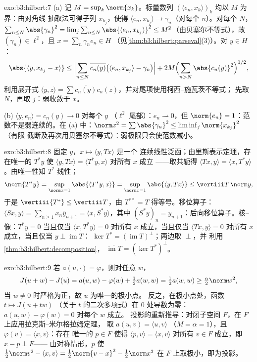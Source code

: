\begin{solution}{exo:b3:hilbert:7}
(a) 记 $M = \sup_k\norm{x_k}$。标量数列
$(\langle e_n, x_k\rangle)_k$ 均以 $M$ 为界：由对角线
抽取法可得子列 $x_{k_j}$，使得 $\langle e_n, x_{k_j}\rangle
\to \gamma_n$（对每个 $n$）。对每个 $N$，$\sum_{n\leq
N}\abs{\gamma_n}^2 = \lim_j\sum_{n\leq N}\abs{\langle e_n,
x_{k_j}\rangle}^2 \leq M^2$（由贝塞尔不等式），故 $(\gamma_n) \in
\ell^2$，且 $x = \sum_n\gamma_ne_n \in H$
（见\cref{thm:b3:hilbert:parseval}(3)）。对 $y \in H$：
\[
\abs{\langle y, x_{k_j} - x\rangle}
\leq \Bigl|\sum_{n\leq N}\overline{c_n(y)}\bigl(\langle e_n,
x_{k_j}\rangle - \gamma_n\bigr)\Bigr|
+ 2M\Bigl(\sum_{n>N}\abs{c_n(y)}^2\Bigr)^{1/2},
\]
利用展开式 $\langle y, z\rangle =
\sum\overline{c_n(y)}c_n(z)$，并对尾项使用柯西–施瓦茨不等式；
先取 $N$，再取 $j$：弱收敛于 $x$。

(b) $\langle y, e_n\rangle = c_n(y) \to 0$ 对每个 $y$
（$\ell^2$ 尾部）：$e_n \rightharpoonup 0$，但 $\norm{e_n} =
1$：范数不是弱连续的。在 (a) 中：$\norm x^2 =
\sum\abs{\gamma_n}^2 \leq \liminf_j\norm{x_{k_j}}^2$（有限
截断及再次用贝塞尔不等式）：弱极限只会使范数减小。
\end{solution}

\begin{solution}{exo:b3:hilbert:8}
固定 $y$，$x \mapsto \langle y, Tx\rangle$ 是一个
连续线性泛函；由里斯表示定理，存在唯一的 $T^*y$ 使
$\langle y, Tx\rangle = \langle T^*y, x\rangle$ 对所有 $x$ 成立
——取共轭得 $\langle Tx, y\rangle = \langle x,
T^*y\rangle$。由唯一性知 $T^*$ 线性；
\[
\norm{T^*y} = \sup_{\norm x = 1}\abs{\langle T^*y, x\rangle}
= \sup_{\norm x=1}\abs{\langle y, Tx\rangle}
\leq \vertiii T\,\norm y,
\]
于是 $\vertiii{T^*} \leq \vertiii T$，由 $T^{**} = T$
得等号。移位算子：$\langle Sx, y\rangle = \sum_{n\geq1}
x_n\bar y_{n+1} = \langle x, S^*y\rangle$，其中 $(S^*y)_n =
y_{n+1}$：后向移位算子。核--像：$T^*y = 0$ 当且仅当
$\langle x, T^*y\rangle = 0$ 对所有 $x$ 成立，当且仅当 $\langle Tx,
y\rangle = 0$ 对所有 $x$ 成立，当且仅当 $y \perp \operatorname{im}T$：
$\ker T^* = (\operatorname{im}T)^\perp$；两边取 $\perp$，并
利用\cref{thm:b3:hilbert:decomposition}，
$\overline{\operatorname{im}T} = (\ker T^*)^\perp$。
\end{solution}

\begin{solution}{exo:b3:hilbert:9}
若 $a(u, \cdot) = \varphi$，则对任意 $w$，
\[
J(u + w) - J(u) = a(u, w) - \varphi(w) + \tfrac12a(w,w)
= \tfrac12a(w,w) \geq \tfrac\alpha2\norm w^2,
\]
当 $w \neq 0$ 时严格为正，故 $u$ 为唯一的极小点。
反之，在极小点处，函数 $t \mapsto J(u + tw)$
（关于 $t$ 的二次多项式）在
$0$ 处导数为零：$a(u, w) - \varphi(w) = 0$ 对每个 $w$ 成立。
投影的重新推导：对闭子空间 $F$，在 $F$ 上应用拉克斯–米尔格拉姆定理，
取 $a(u,v) = \langle u, v\rangle$
（$M = \alpha = 1$），且 $\varphi(v) = \langle x, v\rangle$：存在
唯一的 $p \in F$ 使得 $\langle p, v\rangle = \langle x,
v\rangle$ 对所有 $v \in F$ 成立，即 $x - p \perp F$——
由对称情形，$p$ 使 $\frac12\norm v^2 - \langle
x, v\rangle = \frac12\norm{v - x}^2 - \frac12\norm x^2$ 在
$F$ 上取极小，即为投影。
\end{solution}

